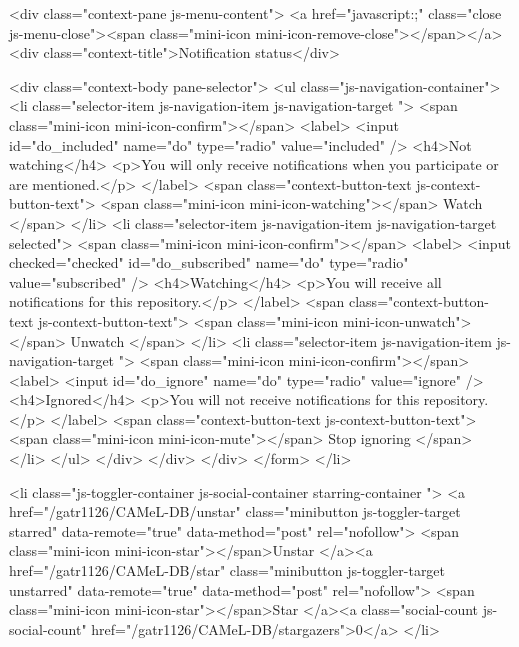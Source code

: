     <div class="context-pane js-menu-content">
      <a href="javascript:;" class="close js-menu-close"><span class="mini-icon mini-icon-remove-close"></span></a>
      <div class="context-title">Notification status</div>

      <div class="context-body pane-selector">
        <ul class="js-navigation-container">
          <li class="selector-item js-navigation-item js-navigation-target ">
            <span class="mini-icon mini-icon-confirm"></span>
            <label>
              <input id="do_included" name="do" type="radio" value="included" />
              <h4>Not watching</h4>
              <p>You will only receive notifications when you participate or are mentioned.</p>
            </label>
            <span class="context-button-text js-context-button-text">
              <span class="mini-icon mini-icon-watching"></span>
              Watch
            </span>
          </li>
          <li class="selector-item js-navigation-item js-navigation-target selected">
            <span class="mini-icon mini-icon-confirm"></span>
            <label>
              <input checked="checked" id="do_subscribed" name="do" type="radio" value="subscribed" />
              <h4>Watching</h4>
              <p>You will receive all notifications for this repository.</p>
            </label>
            <span class="context-button-text js-context-button-text">
              <span class="mini-icon mini-icon-unwatch"></span>
              Unwatch
            </span>
          </li>
          <li class="selector-item js-navigation-item js-navigation-target ">
            <span class="mini-icon mini-icon-confirm"></span>
            <label>
              <input id="do_ignore" name="do" type="radio" value="ignore" />
              <h4>Ignored</h4>
              <p>You will not receive notifications for this repository.</p>
            </label>
            <span class="context-button-text js-context-button-text">
              <span class="mini-icon mini-icon-mute"></span>
              Stop ignoring
            </span>
          </li>
        </ul>
      </div>
    </div>
  </div>
</form>
          </li>

          <li class="js-toggler-container js-social-container starring-container ">
            <a href="/gatr1126/CAMeL-DB/unstar" class="minibutton js-toggler-target starred" data-remote="true" data-method="post" rel="nofollow">
              <span class="mini-icon mini-icon-star"></span>Unstar
            </a><a href="/gatr1126/CAMeL-DB/star" class="minibutton js-toggler-target unstarred" data-remote="true" data-method="post" rel="nofollow">
              <span class="mini-icon mini-icon-star"></span>Star
            </a><a class="social-count js-social-count" href="/gatr1126/CAMeL-DB/stargazers">0</a>
          </li>

